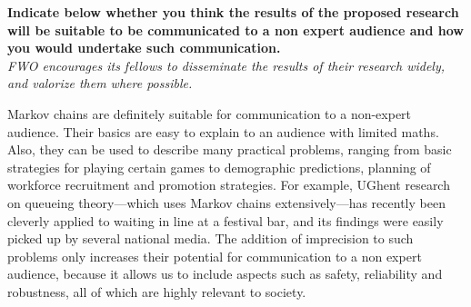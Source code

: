 \documentclass[11pt,dvipsnames,usenames,a4paper]{article}
\begin{document}






\vspace{5mm}

\textbf{Indicate below whether you think the results of the proposed research will be suitable to be communicated to a non expert audience and how you would undertake such communication.}\\
\textit{FWO encourages its fellows to disseminate the results of their research widely, and valorize them where possible.}

Markov chains are definitely suitable for communication to a non-expert audience. 
Their basics are easy to explain to an audience with limited maths. 
Also, they can be used to describe many practical problems, ranging from basic strategies for playing certain games to demographic predictions, planning of workforce recruitment and promotion strategies. 
For example, UGhent research on queueing theory---which uses Markov chains extensively---has recently been cleverly applied to waiting in line at a festival bar, and its findings were easily picked up by several national media.
The addition of imprecision to such problems only increases their potential for communication to a non expert audience, because it allows us to include aspects such as safety, reliability and robustness, all of which are highly relevant to society.
\end{document}
